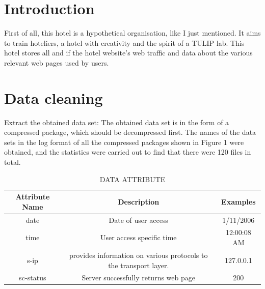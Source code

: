 \section{Introduction}\label{sec-intro}
First of all, this hotel is a hypothetical organisation, like I just mentioned. It aims to train hoteliers, a hotel with creativity and the spirit of a TULIP lab. This hotel stores all and if the hotel website's web traffic and data about the various relevant web pages used by users.

\section{Data cleaning}\label{sec-intro}

	Extract the obtained data set: The obtained data set is in the form of a compressed package, which should be decompressed first.
	The names of the data sets in the log format of all the compressed packages shown in Figure 1 were obtained, and the statistics were carried out to find that there were 120 files in total.

\begin{table}  \centering
  \caption{DATA ATTRIBUTE}
  \label{tbl:overall-experiments}
  \begin{tabular}{ccc}
\toprule
    Attribute Name &Description& Examples \\
\midrule
   date & Date of user access & 1/11/2006 \\
    time & User access specific time & 12:00:08 AM \\
    s-ip &provides information on various protocols to the transport layer. & 127.0.0.1 \\
    sc-status & Server successfully returns web page & 200\\

\bottomrule
\end{tabular}
\end{table}



